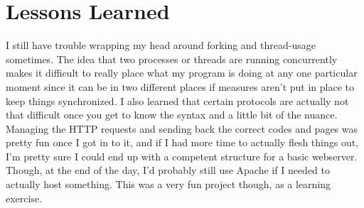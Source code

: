 \documentclass[11pt]{report}
\begin{document}
\section*{Lessons Learned}
I still have trouble wrapping my head around forking and thread-usage sometimes. The idea that two processes or threads are running concurrently makes it difficult to really place what my program is doing at any one particular moment since it can be in two different places if measures aren't put in place to keep things synchronized. I also learned that certain protocols are actually not that difficult once you get to know the syntax and a little bit of the nuance. Managing the HTTP requests and sending back the correct codes and pages was pretty fun once I got in to it, and if I had more time to actually flesh things out, I'm pretty sure I could end up with a competent structure for a basic webserver. Though, at the end of the day, I'd probably still use Apache if I needed to actually host something. This was a very fun project though, as a learning exercise.
\end{document}
